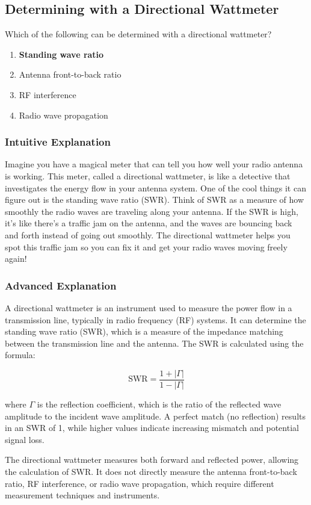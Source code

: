 \subsection{Determining with a Directional Wattmeter}
\label{G4B10}

\begin{tcolorbox}[colback=gray!10!white,colframe=black!75!black,title=G4B10]
Which of the following can be determined with a directional wattmeter?
\begin{enumerate}[label=\Alph*.]
    \item \textbf{Standing wave ratio}
    \item Antenna front-to-back ratio
    \item RF interference
    \item Radio wave propagation
\end{enumerate}
\end{tcolorbox}

\subsubsection{Intuitive Explanation}
Imagine you have a magical meter that can tell you how well your radio antenna is working. This meter, called a directional wattmeter, is like a detective that investigates the energy flow in your antenna system. One of the cool things it can figure out is the standing wave ratio (SWR). Think of SWR as a measure of how smoothly the radio waves are traveling along your antenna. If the SWR is high, it's like there's a traffic jam on the antenna, and the waves are bouncing back and forth instead of going out smoothly. The directional wattmeter helps you spot this traffic jam so you can fix it and get your radio waves moving freely again!

\subsubsection{Advanced Explanation}
A directional wattmeter is an instrument used to measure the power flow in a transmission line, typically in radio frequency (RF) systems. It can determine the standing wave ratio (SWR), which is a measure of the impedance matching between the transmission line and the antenna. The SWR is calculated using the formula:

\[
\text{SWR} = \frac{1 + |\Gamma|}{1 - |\Gamma|}
\]

where \(\Gamma\) is the reflection coefficient, which is the ratio of the reflected wave amplitude to the incident wave amplitude. A perfect match (no reflection) results in an SWR of 1, while higher values indicate increasing mismatch and potential signal loss.

The directional wattmeter measures both forward and reflected power, allowing the calculation of SWR. It does not directly measure the antenna front-to-back ratio, RF interference, or radio wave propagation, which require different measurement techniques and instruments.


